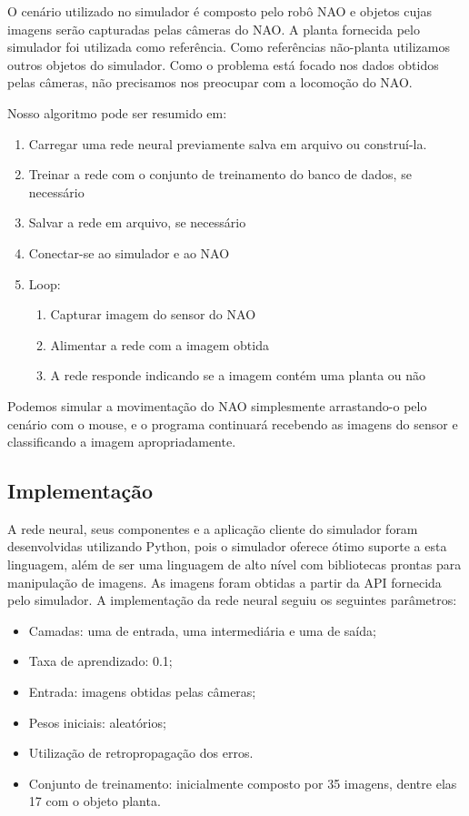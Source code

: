 \documentclass[twoside,conference,a4paper]{IEEEtran}
\begin{document}
O cenário utilizado no simulador é composto pelo robô NAO e objetos cujas imagens serão capturadas pelas câmeras do NAO. A planta fornecida pelo simulador foi utilizada como referência. Como referências não-planta utilizamos outros objetos do simulador. Como o problema está focado nos dados obtidos pelas câmeras, não precisamos nos preocupar com a locomoção do NAO.

Nosso algoritmo pode ser resumido em:
\begin{enumerate}
\item Carregar uma rede neural previamente salva em arquivo ou construí-la.
\item Treinar a rede com o conjunto de treinamento do banco de dados, se necessário
\item Salvar a rede em arquivo, se necessário
\item Conectar-se ao simulador e ao NAO
\item Loop:
  \begin{enumerate}
    \item Capturar imagem do sensor do NAO
    \item Alimentar a rede com a imagem obtida
    \item A rede responde indicando se a imagem contém uma planta ou não
  \end{enumerate}
\end{enumerate}

Podemos simular a movimentação do NAO simplesmente arrastando-o pelo cenário com o mouse, e o programa continuará recebendo as imagens do sensor e classificando a imagem apropriadamente.

\subsection{Implementação}
A rede neural, seus componentes e a aplicação cliente do simulador foram desenvolvidas utilizando Python, pois o simulador oferece ótimo suporte a esta linguagem, além de ser uma linguagem de alto nível com bibliotecas prontas para manipulação de imagens. As imagens foram obtidas a partir da API fornecida pelo simulador. A implementação da rede neural seguiu os seguintes parâmetros:
\begin{itemize}
\item Camadas: uma de entrada, uma intermediária e uma de saída;
\item Taxa de aprendizado: 0.1;
\item Entrada: imagens obtidas pelas câmeras;
\item Pesos iniciais: aleatórios;
\item Utilização de retropropagação dos erros.
\item Conjunto de treinamento: inicialmente composto por 35 imagens, dentre elas 17 com o objeto planta.
\end{itemize}
\end{document}

